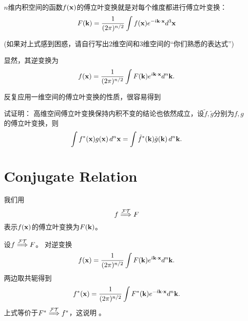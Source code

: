 \documentclass[CJK]{beamer}
\begin{document}
\begin{frame}
  \bch
  $n$维内积空间的函数$f({\mathbf{x}})$的傅立叶变换就是对每个维度都进行傅立叶变换：
  $$ F({\mathbf{k}}) = \frac{1}{(2\pi)^{n/2}}\int f({\mathbf{x}}) e^{-{\dot{\imath}} {\mathbf{k}} \cdot {\mathbf{x}}} d^3{\mathbf{x}} $$

  {\scriptsize (如果对上式感到困惑，请自行写出2维空间和3维空间的“你们熟悉的表达式”)}

  显然，其逆变换为
  $$ f({\mathbf{x}}) = \frac{1}{(2\pi)^{n/2}}\int F({\mathbf{k}}) e^{{\dot{\imath}} {\mathbf{k}} \cdot {\mathbf{x}}} d^n{\mathbf{k}}. $$
  
  \ech
\end{frame}

\begin{frame}
  \bch
  反复应用一维空间的傅立叶变换的性质，很容易得到
  
  \ech
\end{frame}


\begin{frame}
  \bch
  
  试证明：  高维空间傅立叶变换保持内积不变的结论也依然成立，设$\tilde{f}, \tilde{g}$分别为$f,g$的傅立叶变换，则
{\blue  $$\int  f^*({\mathbf{x}})g({\mathbf{x}})\,d^n{\mathbf{x}} = \int \tilde{f}^*({\mathbf{k}}) \tilde{g}({\mathbf{k}})\, d^n{\mathbf{k}} . $$}

  \ech
\end{frame}




\section{Conjugate Relation}


\begin{frame}
  \bch
  我们用
  $$f \stackrel{\mathcal{FT}}{\Longrightarrow} F $$
  表示$f({\mathbf{x}})$的傅立叶变换为$F({\mathbf{k}})$。
  \ech
\end{frame}


\begin{frame}
  \bch
  设$f \stackrel{\mathcal{FT}}{\Longrightarrow} F $。  对逆变换  
  $$ f({\mathbf{x}}) = \frac{1}{(2\pi)^{n/2}}\int F({\mathbf{k}}) e^{{\dot{\imath}} {\mathbf{k}} \cdot {\mathbf{x}}} d^n{\mathbf{k}}. $$
  两边取共轭得到
  $$ f^*({\mathbf{x}}) = \frac{1}{(2\pi)^{n/2}}\int F^*({\mathbf{k}}) e^{-{\dot{\imath}} {\mathbf{k}} \cdot {\mathbf{x}}} d^n{\mathbf{k}}. $$
  上式等价于$ F^*\stackrel{\mathcal{FT}}{\Longrightarrow} f^*$，这说明
  。
  \ech
\end{frame}
\end{document}
